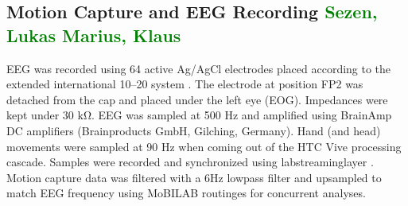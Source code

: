 \subsection{Motion Capture and EEG Recording \textcolor{green}{Sezen, Lukas Marius, Klaus}}
EEG was recorded using 64 active Ag/AgCl electrodes placed according to the extended international 10–20 system \cite{chatrian_ten_1985}. The electrode at position FP2 was detached from the cap and placed under the left eye (EOG). Impedances were kept under 30 \si{\kohm}. EEG was sampled at 500 Hz and amplified using BrainAmp DC amplifiers (Brainproducts GmbH, Gilching, Germany). Hand (and head) movements were sampled at 90 Hz when coming out of the HTC Vive processing cascade. Samples were recorded and synchronized using labstreaminglayer \cite{}. Motion capture data was filtered with a 6Hz lowpass filter and upsampled to match EEG frequency using MoBILAB routinges \cite{} for concurrent analyses.

